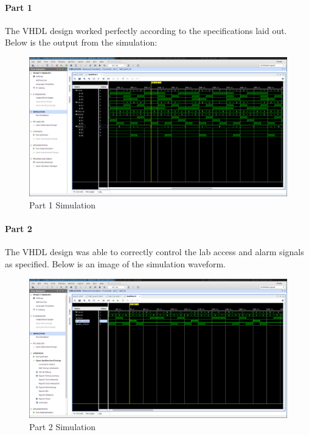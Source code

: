 \documentclass{article}
\begin{document}
    \paragraph{Part 1}
    The VHDL design worked perfectly according to the specifications laid out.
    Below is the output from the simulation:

    \begin{figure}[H]
        \includegraphics[width=\linewidth]{MUX_DEMUX.png}
        \caption{Part 1 Simulation}
        \label{fig:part1_sim}
    \end{figure}

    \paragraph{Part 2}
    The VHDL design was able to correctly control the lab access and alarm signals
    as specified.
    Below is an image of the simulation waveform.

    \begin{figure}[H]
        \includegraphics[width=\linewidth]{Access_control.png}
        \caption{Part 2 Simulation}
        \label{fig:part2_sim}
    \end{figure}
\end{document}
